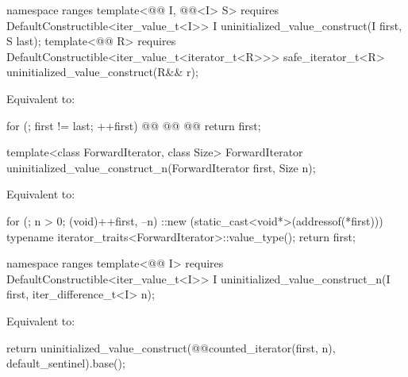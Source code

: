 \begin{addedblock}
%
\begin{itemdecl}
namespace ranges {
  template<@@ I, @@<I> S>
      requires DefaultConstructible<iter_value_t<I>>
    I uninitialized_value_construct(I first, S last);
  template<@@ R>
      requires DefaultConstructible<iter_value_t<iterator_t<R>>>
    safe_iterator_t<R> uninitialized_value_construct(R&& r);
}
\end{itemdecl}

\begin{itemdescr}
\pnum
\effects Equivalent to:
\begin{codeblock}
for (; first != last; ++first)
  @@
    @@
  @@
return first;
\end{codeblock}
\end{itemdescr}
\end{addedblock}

%
\begin{itemdecl}
template<class ForwardIterator, class Size>
  ForwardIterator uninitialized_value_construct_n(ForwardIterator first, Size n);
\end{itemdecl}

\begin{itemdescr}
\pnum
\effects
Equivalent to:
\begin{codeblock}
for (; n > 0; (void)++first, --n)
  ::new (static_cast<void*>(addressof(*first)))
    typename iterator_traits<ForwardIterator>::value_type();
return first;
\end{codeblock}
\end{itemdescr}

\begin{addedblock}
%
\begin{itemdecl}
namespace ranges {
  template<@@ I>
      requires DefaultConstructible<iter_value_t<I>>
    I uninitialized_value_construct_n(I first, iter_difference_t<I> n);
}
\end{itemdecl}

\begin{itemdescr}
\pnum
\effects Equivalent to:
\begin{codeblock}
return uninitialized_value_construct(@@counted_iterator(first, n),
                                     default_sentinel{}).base();
\end{codeblock}
\end{itemdescr}
\end{addedblock}

